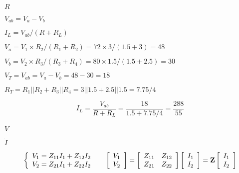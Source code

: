 {\newpage\clearpage
{}%
$R$%
\lthtmlinlinemathZ
\lthtmlcheckvsize\clearpage}

{\newpage\clearpage
{}%
$V_{ab}=V_a-V_b$%
\lthtmlinlinemathZ
\lthtmlcheckvsize\clearpage}

{\newpage\clearpage
{}%
$I_L=V_{ab}/(R+R_L)$%
\lthtmlinlinemathZ
\lthtmlcheckvsize\clearpage}

{\newpage\clearpage
{}%
$V_a=V_1\times R_2/(R_1+R_2)=72\times 3/(1.5+3)=48$%
\lthtmlinlinemathZ
\lthtmlcheckvsize\clearpage}

{\newpage\clearpage
{}%
$V_b=V_2\times R_3/(R_3+R_4)=80\times 1.5/(1.5+2.5)=30$%
\lthtmlinlinemathZ
\lthtmlcheckvsize\clearpage}

{\newpage\clearpage
{}%
$V_T=V_{ab}=V_a-V_b=48-30=18$%
\lthtmlinlinemathZ
\lthtmlcheckvsize\clearpage}

{\newpage\clearpage
{}%
$R_T=R_1 || R_2 + R_3 || R_4=3||1.5+2.5||1.5=7.75/4$%
\lthtmlinlinemathZ
\lthtmlcheckvsize\clearpage}

{\newpage\clearpage
{}%
\begin{displaymath} I_L=\frac{V_{ab}}{R+R_L}=\frac{18}{1.5+7.75/4}=\frac{288}{55} \end{displaymath}%
\lthtmldisplayZ
\lthtmlcheckvsize\clearpage}

{\newpage\clearpage
{}%
$\dot{V}$%
\lthtmlinlinemathZ
\lthtmlcheckvsize\clearpage}

{\newpage\clearpage
{}%
$\dot{I}$%
\lthtmlinlinemathZ
\lthtmlcheckvsize\clearpage}

{\newpage\clearpage
{}%
\begin{displaymath} \left\{ \begin{array}{l} V_1=Z_{11}I_1+Z_{12}I_2 \\
    V_2=Z_{21}I_1+Z_{22}I_2 \end{array} \right.\;\;\;\;\;
  \left[ \begin{array}{l} V_1 \\V_2\end{array} \right]=
  \left[ \begin{array}{ll} Z_{11} & Z_{12}\\Z_{21} & Z_{22}\end{array}\right]
  \left[ \begin{array}{l} I_1 \\I_2\end{array} \right]
  ={\bf Z}\left[ \begin{array}{l} I_1 \\I_2\end{array} \right] \end{displaymath}%
\lthtmldisplayZ
\lthtmlcheckvsize\clearpage}

